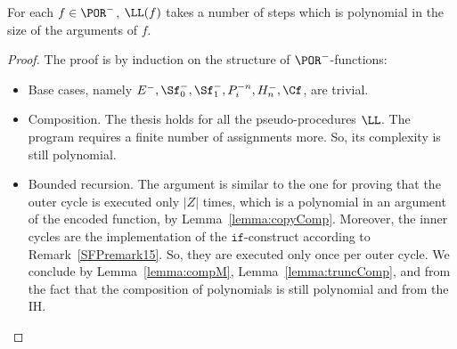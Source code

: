 \begin{prop}
For each $f \in \POR^-$, $\LL(f)$ takes
a number of steps which
is polynomial in the size of the
arguments of $f$.
\end{prop}

\begin{proof}
The proof is by induction on the structure
of $\POR^-$-functions:
\begin{itemize}
\item Base cases, namely
$E^-, \Sf_0^-, \Sf_1^-, P^{-n}_i, H^-_n, \Cf$,
are trivial.
%
\item Composition. The thesis holds for all
the pseudo-procedures $\LL$.
The program requires a finite number of assignments
{more}.
So, its complexity is still polynomial.
%
\item Bounded recursion.
The argument is similar to the one for proving
that the outer cycle is executed only $|Z|$ times,
which is a polynomial in an argument of the encoded
function, by Lemma~\ref{lemma:copyComp}.
Moreover, the inner cycles are the implementation
of the $\mathtt{if}$-construct according to
Remark~\ref{SFPremark15}.
So, they are executed only once per outer
cycle.
We conclude by Lemma~\ref{lemma:compM},
Lemma~\ref{lemma:truncComp}, and
from the fact that the composition
of polynomials is still polynomial and
from the IH.
\end{itemize}
\end{proof}




